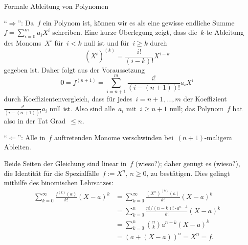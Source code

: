 \documentclass{algblatt}
\begin{document}
\begin{aufgabe}{Formale Ableitung von Polynomen}
\begin{loesungE}
\item "`$\Longrightarrow$"': Da~$f$ ein Polynom ist, können wir es als eine gewisse
endliche Summe~$f = \sum_{i=0}^m a_i X^i$ schreiben. Eine kurze Überlegung
zeigt, dass die~$k$-te Ableitung des Monoms~$X^i$ für~$i < k$ null ist und
für~$i \geq k$ durch
\[ (X^i)^{(k)} = \frac{i!}{(i-k)!} X^{i-k} \]
gegeben ist. Daher folgt aus der Voraussetzung
\[ 0 = f^{(n+1)} = \sum_{i=n+1}^m \frac{i!}{(i-(n+1))!} a_i X^i \]
durch Koeffizientenvergleich, dass für jedes~$i = n+1,\ldots,m$ der
Koeffizient~$\frac{i!}{(i-(n+1))!} a_i$ null ist. Also sind alle~$a_i$ mit~$i
\geq n+1$ null; das Polynom~$f$ hat also in der Tat Grad~$\leq n$.

"`$\Longleftarrow$"': Alle in~$f$ auftretenden Monome verschwinden bei~$(n+1)$-maligem Ableiten.

\item Beide Seiten der Gleichung sind linear in~$f$ (wieso?); daher genügt es
(wieso?), die Identität für die Spezialfälle~$f := X^n$, $n \geq 0$, zu
bestätigen. Dies gelingt mithilfe des binomischen Lehrsatzes:
\begin{align*}
  \sum_{k=0}^\infty \frac{f^{(k)}(a)}{k!} (X-a)^k &=
  \sum_{k=0}^\infty \frac{(X^n)^{(k)}(a)}{k!} (X-a)^k \\
  &= \sum_{k=0}^n \frac{n! / (n-k)! \cdot a^{n-k}}{k!} (X-a)^k \\
  &= \sum_{k=0}^n \binom{n}{k} a^{n-k} (X-a)^k \\
  &= (a + (X-a))^n = X^n = f.
\end{align*}
\end{loesungE}
\end{aufgabe}
\end{document}
